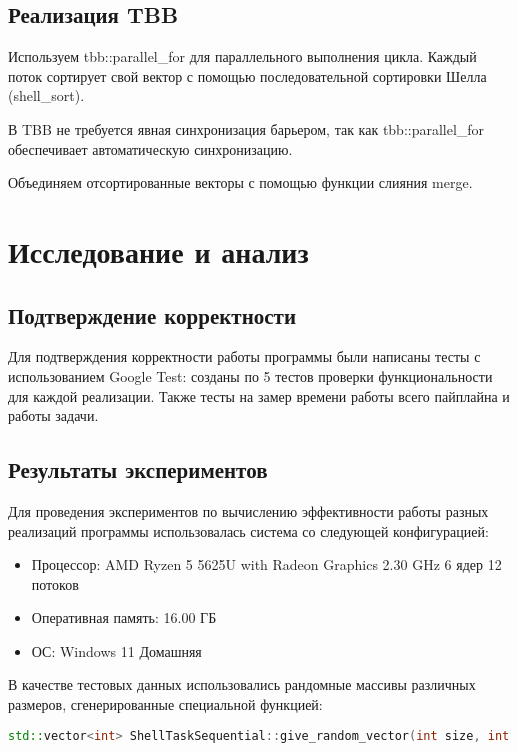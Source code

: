 \documentclass[]{article}
\theoremstyle{remark}
\theoremstyle{definition}
\newcommand{\cpp}{\textit{}}
\begin{document}
\subsection{Реализация TBB}

\par Используем \cpp{tbb::parallel\_for} для параллельного выполнения цикла. Каждый поток сортирует свой вектор с помощью последовательной сортировки Шелла (\cpp{shell\_sort}).
\par В TBB не требуется явная синхронизация барьером, так как \cpp{tbb::parallel\_for} обеспечивает автоматическую синхронизацию.
\par Объединяем отсортированные векторы с помощью функции слияния \cpp{merge}.


\section{Исследование и анализ}

\subsection{Подтверждение корректности}

\par Для подтверждения корректности работы программы были написаны тесты с использованием Google Test: созданы по 5 тестов проверки функциональности для каждой реализации. Также тесты на замер времени работы всего пайплайна и работы задачи.

\subsection{Результаты экспериментов}

\par Для проведения экспериментов по вычислению эффективности работы разных реализаций программы использовалась система со следующей конфигурацией:

\begin{itemize}
    \item Процессор: AMD Ryzen 5 5625U with Radeon Graphics 2.30 GHz 6 ядер 12 потоков
    \item Оперативная память: 16.00 ГБ
    \item ОС: Windows 11 Домашняя
\end{itemize}

\par В качестве тестовых данных использовались рандомные массивы различных размеров, сгенерированные специальной функцией:
\begin{lstlisting}[language=C++]
std::vector<int> ShellTaskSequential::give_random_vector(int size, int min, int max);
\end{lstlisting}
\end{document}
